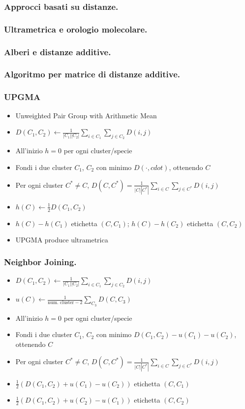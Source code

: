 \begin{frame}[fragile]
\frametitle{Approcci basati su distanze.}
\end{frame}

\begin{frame}[fragile]
\frametitle{Ultrametrica e orologio molecolare.}
\end{frame}

\begin{frame}[fragile]
\frametitle{Alberi e distanze additive.}
\end{frame}

\begin{frame}[fragile]
\frametitle{Algoritmo per matrice di distanze additive.}
\end{frame}

\begin{frame}[fragile]
  \frametitle{UPGMA}
\begin{itemize}
\item
  Unweighted Pair Group with Arithmetic Mean
\item
  $D(C_{1}, C_{2}) \gets \frac{1}{|C_{1}||C_{2}|}\sum_{i\in C_{1}}\sum_{j\in C_{2}} D(i,j)$
\item
  All'inizio $h=0$ per ogni cluster/specie
\item
  Fondi i due cluster $C_{1}$, $C_{2}$ con minimo $D(\cdot, cdot)$, ottenendo $C$
\item
  Per ogni cluster $C^{*}\neq C$, $D(C, C^{*}) = \frac{1}{|C||C^{*}|}\sum_{i\in C}\sum_{j\in C^{*}} D(i,j)$
\item
  $h(C)\gets \frac{1}{2}D(C_{1}, C_{2})$
\item
  $h(C) - h(C_{1})$ etichetta $(C, C_{1})$; $h(C) - h(C_{2})$ etichetta $(C, C_{2})$
\item
  UPGMA produce ultrametrica
\end{itemize}
\end{frame}

\begin{frame}[fragile]
\frametitle{Neighbor Joining.}
\begin{itemize}
\item
  $D(C_{1}, C_{2}) \gets \frac{1}{|C_{1}||C_{2}|}\sum_{i\in C_{1}}\sum_{j\in C_{2}} D(i,j)$
\item
  $u(C) \gets \frac{1}{\text{num. cluster} - 2} \sum_{C_{3}} D(C,C_{3})$
\item
  All'inizio $h=0$ per ogni cluster/specie
\item
  Fondi i due cluster $C_{1}$, $C_{2}$ con minimo $D(C_{1}, C_{2}) - u(C_{1}) -u(C_{2})$, ottenendo $C$
\item
  Per ogni cluster $C^{*}\neq C$, $D(C, C^{*}) = \frac{1}{|C||C^{*}|}\sum_{i\in C}\sum_{j\in C^{*}} D(i,j)$
\item
  $\frac{1}{2}\left(D(C_{1}, C_{2}) + u(C_{1}) - u(C_{2})\right)$ etichetta $(C, C_{1})$
\item
  $\frac{1}{2}\left(D(C_{1}, C_{2}) + u(C_{2}) - u(C_{1})\right)$ etichetta $(C, C_{2})$
\end{itemize}
\end{frame}

